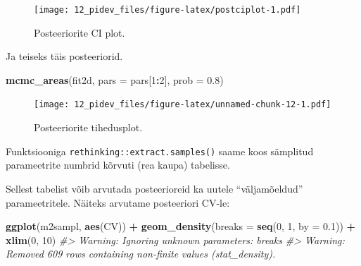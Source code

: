 \documentclass[]{book}
\newenvironment{Shaded}{\begin{snugshade}}{\end{snugshade}}
\newcommand{\CommentTok}[1]{\textcolor[rgb]{0.56,0.35,0.01}{\textit{#1}}}
\newcommand{\DataTypeTok}[1]{\textcolor[rgb]{0.13,0.29,0.53}{#1}}
\newcommand{\DecValTok}[1]{\textcolor[rgb]{0.00,0.00,0.81}{#1}}
\newcommand{\FloatTok}[1]{\textcolor[rgb]{0.00,0.00,0.81}{#1}}
\newcommand{\KeywordTok}[1]{\textcolor[rgb]{0.13,0.29,0.53}{\textbf{#1}}}
\newcommand{\NormalTok}[1]{#1}
\newcommand{\OperatorTok}[1]{\textcolor[rgb]{0.81,0.36,0.00}{\textbf{#1}}}
\newcommand{\StringTok}[1]{\textcolor[rgb]{0.31,0.60,0.02}{#1}}
\begin{document}
\begin{figure}
\centering
\texttt{[image: 12\_pidev\_files/figure-latex/postciplot-1.pdf]}
\caption{\label{fig:postciplot}Posteeriorite CI plot.}
\end{figure}

Ja teiseks täis posteeriorid.

\begin{Shaded}
\begin{Highlighting}[]
\KeywordTok{mcmc_areas}\NormalTok{(fit2d, }\DataTypeTok{pars =}\NormalTok{ pars[}\DecValTok{1}\OperatorTok{:}\DecValTok{2}\NormalTok{], }\DataTypeTok{prob =} \FloatTok{0.8}\NormalTok{)}
\end{Highlighting}
\end{Shaded}

\begin{figure}
\centering
\texttt{[image: 12\_pidev\_files/figure-latex/unnamed-chunk-12-1.pdf]}
\caption{\label{fig:unnamed-chunk-12}Posteeriorite tihedusplot.}
\end{figure}

Funktsiooniga \texttt{rethinking::extract.samples()} saame koos sämplitud parameetrite numbrid kõrvuti (rea kaupa) tabelisse.

\begin{Shaded}
\end{Shaded}

Sellest tabelist võib arvutada posteerioreid ka uutele ``väljamõeldud'' parameetritele.
Näiteks arvutame posteeriori CV-le:

\begin{Shaded}
\begin{Highlighting}[]
\KeywordTok{ggplot}\NormalTok{(m2sampl, }\KeywordTok{aes}\NormalTok{(CV)) }\OperatorTok{+}\StringTok{ }
\StringTok{  }\KeywordTok{geom_density}\NormalTok{(}\DataTypeTok{breaks =} \KeywordTok{seq}\NormalTok{(}\DecValTok{0}\NormalTok{, }\DecValTok{1}\NormalTok{, }\DataTypeTok{by =} \FloatTok{0.1}\NormalTok{)) }\OperatorTok{+}\StringTok{ }
\StringTok{  }\KeywordTok{xlim}\NormalTok{(}\DecValTok{0}\NormalTok{, }\DecValTok{10}\NormalTok{)}
\CommentTok{#> Warning: Ignoring unknown parameters: breaks}
\CommentTok{#> Warning: Removed 609 rows containing non-finite values (stat_density).}
\end{Highlighting}
\end{Shaded}
\end{document}
